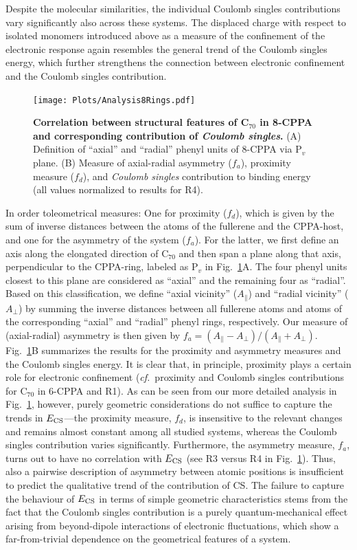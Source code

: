 \documentclass[aps,prl,groupaddress, twocolumn]{revtex4-1}  %
\begin{document}
Despite the molecular similarities, the individual Coulomb singles contributions vary significantly also across these systems. The displaced charge with respect to isolated monomers introduced above as a measure of the confinement of the electronic response again resembles the general trend of the Coulomb singles energy, which further strengthens the connection between electronic confinement and the Coulomb singles contribution.

\begin{figure}[htp]
\texttt{[image: Plots/Analysis8Rings.pdf]}
\caption{\textbf{Correlation between structural features of C$_{70}$ in 8-CPPA and corresponding contribution of \emph{Coulomb singles}.} (A) Definition of ``axial'' and ``radial'' phenyl units of 8-CPPA via P$_v$ plane. (B) Measure of axial-radial asymmetry ($f_a$), proximity measure ($f_d$), and \emph{Coulomb singles} contribution to binding energy (all values normalized to results for R4).}\label{fig:analysis_rings}
\end{figure}

In order toleometrical measures:
One for proximity ($f_d$), which is given by the sum of inverse distances between the atoms of the fullerene and the CPPA-host, and one for the asymmetry of the system ($f_a$).
For the latter, we first define an axis along the elongated direction of C$_{70}$ and then span a plane along that axis, perpendicular to the CPPA-ring, labeled as P$_v$ in Fig.~\ref{fig:analysis_rings}A.
The four phenyl units closest to this plane are considered as ``axial'' and the remaining four as ``radial''.
Based on this classification, we define ``axial vicinity'' ($A_{\parallel}$) and ``radial vicinity'' ($A_{\perp}$) by summing the inverse distances between all fullerene atoms and atoms of the corresponding ``axial'' and ``radial'' phenyl rings, respectively.
Our measure of (axial-radial) asymmetry is then given by $f_a = (A_{\parallel} - A_{\perp})/(A_{\parallel} + A_{\perp})$. Fig.~\ref{fig:analysis_rings}B summarizes the results for the proximity and asymmetry measures and the Coulomb singles energy.
It is clear that, in principle, proximity plays a certain role for electronic confinement (\textit{cf.}\ proximity and Coulomb singles contributions for C$_{70}$ in 6-CPPA and R1). As can be seen from our more detailed analysis in Fig.~\ref{fig:analysis_rings}, however, purely geometric considerations do not suffice to capture the trends in $E_{\rm CS}$---the proximity measure, $f_d$, is insensitive to the relevant changes and remains almost constant among all studied systems, whereas the Coulomb singles contribution varies significantly.
Furthermore, the asymmetry measure, $f_a$, turns out to have no correlation with $E_{\rm CS}$ (see R3 versus R4 in Fig.~\ref{fig:analysis_rings}).
Thus, also a pairwise description of asymmetry between atomic positions is insufficient to predict the qualitative trend of the contribution of CS\@.
The failure to capture the behaviour of $E_{\rm CS}$ in terms of simple geometric characteristics stems from the fact that the Coulomb singles contribution is a purely quantum-mechanical effect arising from beyond-dipole interactions of electronic fluctuations, which show a far-from-trivial dependence on the geometrical features of a system.
\end{document}
